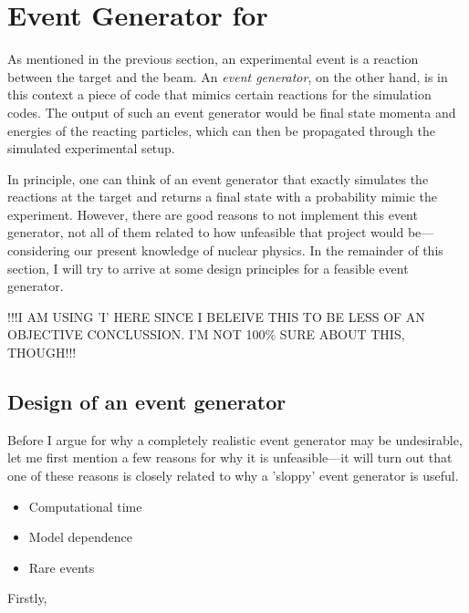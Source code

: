 \section{Event Generator for \rtb{}}
As mentioned in the previous section, an experimental event is a reaction between the target and the beam.
An \emph{event generator}, on the other hand, is in this context a piece of code that mimics certain reactions for the simulation codes. The output of such an event generator would be final state momenta and energies of the reacting particles, which can then be propagated through the simulated experimental setup. %

In principle, one can think of an event generator that exactly simulates the reactions at the target and returns a final state with a probability mimic the experiment. However, there are good reasons to not implement this event generator, not all of them related to how unfeasible that project would be---considering our present knowledge of nuclear physics. In the remainder of this section, I will try to arrive at some design principles for a feasible event generator.

!!!I AM USING 'I' HERE SINCE I BELEIVE THIS TO BE LESS OF AN OBJECTIVE CONCLUSSION. I'M NOT 100\% SURE ABOUT THIS, THOUGH!!!

\subsection{Design of an event generator}
Before I argue for why a completely realistic event generator may be undesirable, let me first mention a few reasons for why it is unfeasible---it will turn out that one of these reasons is closely related to why a 'sloppy' event generator is useful.



\begin{itemize}
\item Computational time
\item Model dependence
\item Rare events
\end{itemize}

Firstly, 

\subsection{}